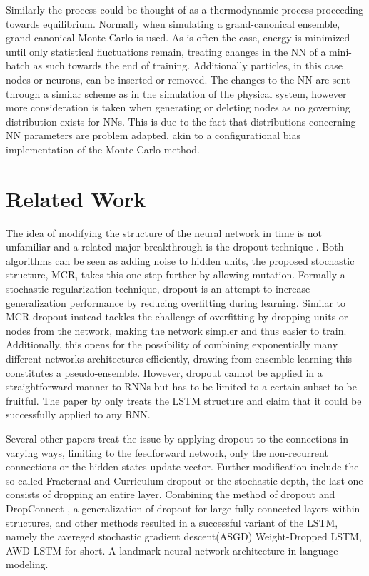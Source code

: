 Similarly the process could be thought of as a thermodynamic process proceeding towards equilibrium. Normally when simulating a grand-canonical ensemble, grand-canonical Monte Carlo is used. As is often the case, energy is minimized until only statistical fluctuations remain, treating changes in the NN of a mini-batch as such towards the end of training. Additionally particles, in this case nodes or neurons, can be inserted or removed. The changes to the NN are sent through a similar scheme as in the simulation of the physical system, however more consideration is taken when generating or deleting nodes as no governing distribution exists for NNs. This is due to the fact that distributions concerning NN parameters are problem adapted, akin to a configurational bias implementation of the Monte Carlo method. 

\section{Related Work}

The idea of modifying the structure of the neural network in time is not unfamiliar and a related major breakthrough is the dropout technique \cite{drop}. Both algorithms can be seen as adding noise to hidden units, the proposed stochastic structure, MCR, takes this one step further by allowing mutation. Formally a stochastic regularization technique, dropout is an attempt to increase generalization performance by reducing overfitting during learning. Similar to MCR dropout instead tackles the challenge of overfitting by dropping units or nodes from the network, making the network simpler and thus easier to train. Additionally, this opens for the possibility of combining exponentially many different networks architectures efficiently, drawing from ensemble learning this constitutes a pseudo-ensemble. However, dropout cannot be applied in a straightforward manner to RNNs \cite{dropno} but has to be limited to a certain subset\cite{droprnn} to be fruitful. The paper by \textcite{droprnn} only treats the LSTM structure and claim that it could be successfully applied to any RNN. 

Several other papers treat the issue by applying dropout to the connections in varying ways, limiting to the feedforward network, only the non-recurrent connections or the hidden states update vector. Further modification include the so-called Fracternal and Curriculum dropout or the stochastic depth, the last one consists of dropping an entire layer\cite{stochdep}. Combining the method of dropout and DropConnect \cite{DropConnect}, a generalization of dropout for large fully-connected layers within structures, and other methods resulted in a successful variant of the LSTM, namely the avereged stochastic gradient descent(ASGD) Weight-Dropped LSTM, AWD-LSTM for short. A landmark neural network architecture in language-modeling. 

